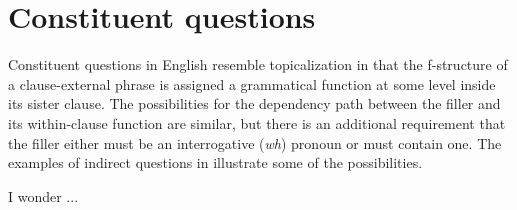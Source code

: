 \documentclass[output=paper,hidelinks]{langscibook}
\begin{document}




\section{Constituent questions}\label{constituentquestions}

Constituent questions in English resemble topicalization in that the f-structure of a clause-external phrase is assigned a grammatical function at some level inside its sister clause. The possibilities for the dependency path between the filler and its within-clause function are similar,  but there is an additional requirement that the filler either must be an interrogative (\textit{wh}) pronoun or must contain one.   The examples of indirect questions in  illustrate some of the possibilities.

\newpage
\ea\label{cquestions} I wonder ...
\label{cquestions1}
\label{cquestions2} 
\label{cquestionsd} 
\z\z
\end{document}
